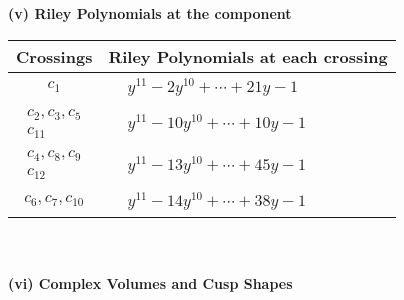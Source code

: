 \documentclass[1p]{elsarticle_modified}
\theoremstyle{definition}
\begin{document}
\newpage\renewcommand{\arraystretch}{1}
\flushleft \textbf{(v) Riley Polynomials at the component}\newline \\
\begin{tabular}{m{50pt}|m{274pt}}
Crossings & \hspace{64pt}Riley Polynomials at each crossing \\
\hline $$\begin{aligned}c_{1}\end{aligned}$$&$\begin{aligned}
&y^{11}-2 y^{10}+\cdots+21 y-1
\end{aligned}$\\
\hline $$\begin{aligned}c_{2},c_{3},c_{5}\\c_{11}\end{aligned}$$&$\begin{aligned}
&y^{11}-10 y^{10}+\cdots+10 y-1
\end{aligned}$\\
\hline $$\begin{aligned}c_{4},c_{8},c_{9}\\c_{12}\end{aligned}$$&$\begin{aligned}
&y^{11}-13 y^{10}+\cdots+45 y-1
\end{aligned}$\\
\hline $$\begin{aligned}c_{6},c_{7},c_{10}\end{aligned}$$&$\begin{aligned}
&y^{11}-14 y^{10}+\cdots+38 y-1
\end{aligned}$\\
\hline
\end{tabular}\\~\\
\newpage\flushleft \textbf{(vi) Complex Volumes and Cusp Shapes}
\end{document}
